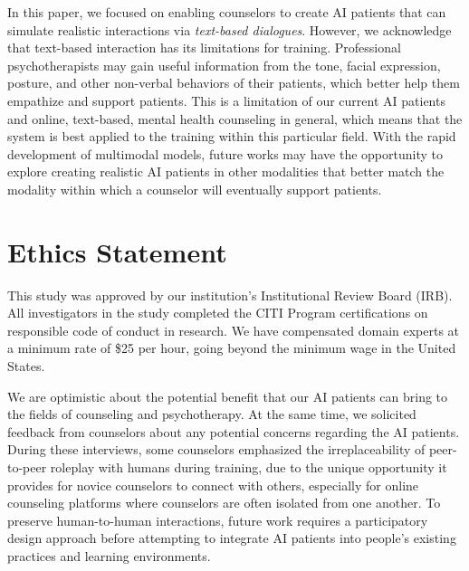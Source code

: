 \documentclass[11pt]{article}
\newcommand{\cheng}[1]{\ifthenelse{\boolean{showcomments}}{\textcolor{purple}{[#1 —cheng]}}{}}
\begin{document}

In this paper, we focused on enabling counselors to create AI patients that can simulate realistic interactions via \textit{text-based dialogues}. However, we acknowledge that text-based interaction has its limitations for training. Professional psychotherapists may gain useful information from the tone, facial expression, posture, and other non-verbal behaviors of their patients, which better help them empathize and support patients.
This is a limitation of our current AI patients and online, text-based, mental health counseling in general, which means that the system is best applied to the training within this particular field. With the rapid development of multimodal models, future works may have the opportunity to explore creating realistic AI patients in other modalities that better match the modality within which a counselor will eventually support patients.


\section*{Ethics Statement} 

This study was approved by our institution's Institutional Review Board (IRB).
All investigators in the study completed the CITI Program certifications on responsible code of conduct in research. We have compensated domain experts at a minimum rate of \$25 per hour, going beyond the minimum wage in the United States.

We are optimistic about the potential benefit that our AI patients can bring to the fields of counseling and psychotherapy. At the same time, we solicited feedback from counselors about any potential concerns regarding the AI patients.
During these interviews, some counselors emphasized the irreplaceability of peer-to-peer roleplay with humans during training, due to the unique opportunity it provides for novice counselors to connect with others, especially for online counseling platforms where counselors are often isolated from one another.
To preserve human-to-human interactions, future work requires a participatory design approach before attempting to integrate AI patients into people's existing practices and learning environments.
\end{document}
